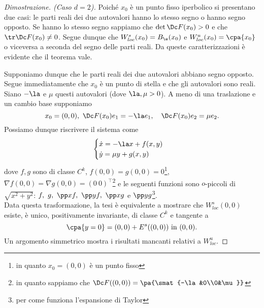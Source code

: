 \begin{proof}[Dimostrazione. (Caso $d=2$)]
Poich\'e $x_0$ \`e un punto fisso iperbolico si presentano due casi: le parti reali dei due autovalori hanno lo stesso segno o hanno segno opposto. Se hanno lo stesso segno sappiamo che $\det \Dc F(x_0)>0$ e che $\tr \Dc F(x_0)\neq 0$. Segue dunque che $W^s_{loc}(x_0)=B_\e(x_0)$ e $W^u_{loc}(x_0)=\cpa{x_0}$ o viceversa a seconda del segno delle parti reali. Da queste caratterizzazioni \`e evidente che il teorema vale.
\vspace{0.5cm}

\noindent Supponiamo dunque che le parti reali dei due autovalori abbiano segno opposto. Segue immediatamente che $x_0$ \`e un punto di stella e che gli autovalori sono reali. Siano $-\la$ e $\mu$ questi autovalori (dove $\la,\mu>0$). A meno di una traslazione e un cambio base supponiamo
\[x_0=(0,0),\ \Dc F(x_0)e_1=-\la e_1,\quad \Dc F(x_0)e_2=\mu e_2.\]
Possiamo dunque riscrivere il sistema come
\[\begin{cases}
\dot x=-\la x+f(x,y)\\
\dot y=\mu y+g(x,y)
\end{cases}\]
dove $f,g$ sono di classe $C^k$, $f(0,0)=g(0,0)=0$\footnote{in quanto $x_0=(0,0)$ \`e un punto fisso}, $\nabla f(0,0)=\nabla g(0,0)=(0\ 0)^\top$\footnote{in quanto sappiamo che $\Dc F((0,0))=\pa{\smat{-\la &0\\0&\mu}}$} e le seguenti funzioni sono $o$-piccoli di $\sqrt{x^2+y^2}$: $f,\ g,\ \pp xf,\ \pp yf,\ \pp xg$ e $\pp y g$\footnote{per come funziona l'espansione di Taylor}.\\
Data questa trasformazione, la tesi \`e equivalente a mostrare che $W^s_{loc}(0,0)$ esiste, \`e unico, positivamente invariante, di classe $C^k$ e tangente a \[\cpa{y=0}=(0,0)+E^s((0,0))\text{ in }(0,0).\] Un argomento simmetrico mostra i risultati mancanti relativi a $W^u_{loc}$.
\vspace{0.5cm}


\end{proof}
